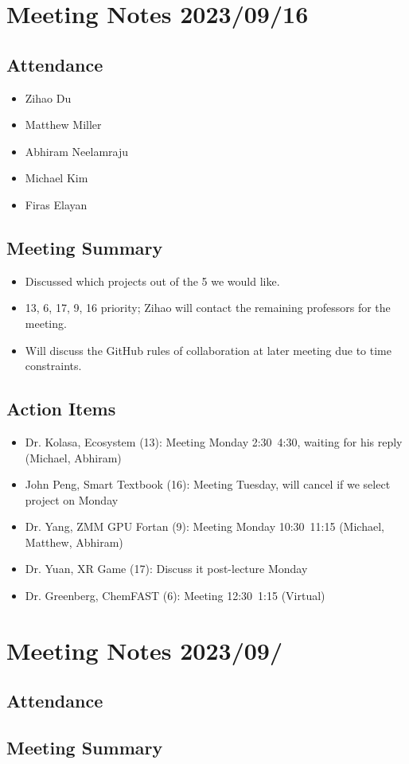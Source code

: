 \documentclass{article}
\begin{document}
\section*{Meeting Notes 2023/09/16}

\subsection*{Attendance}
\begin{itemize}
\item Zihao Du 
\item Matthew Miller
\item Abhiram Neelamraju
\item Michael Kim
\item Firas Elayan
\end{itemize}

\subsection*{Meeting Summary}
\begin{itemize}
\item Discussed which projects out of the 5 we would like.
\item 13, 6, 17, 9, 16 priority; Zihao will contact the remaining professors for the meeting.
\item Will discuss the GitHub rules of collaboration at later meeting due to time constraints.
\end{itemize}

\subsection*{Action Items}
\begin{itemize}
\item Dr. Kolasa, Ecosystem (13): Meeting Monday 2:30~4:30, waiting for his reply (Michael, Abhiram)
\item John Peng, Smart Textbook (16): Meeting Tuesday, will cancel if we select project on Monday
\item Dr. Yang, ZMM GPU Fortan (9): Meeting Monday 10:30~11:15 (Michael, Matthew, Abhiram)
\item Dr. Yuan, XR Game (17): Discuss it post-lecture Monday
\item Dr. Greenberg, ChemFAST (6): Meeting 12:30~1:15 (Virtual)
\end{itemize}

\section*{Meeting Notes 2023/09/}

\subsection*{Attendance}

\subsection*{Meeting Summary}
\end{document}
